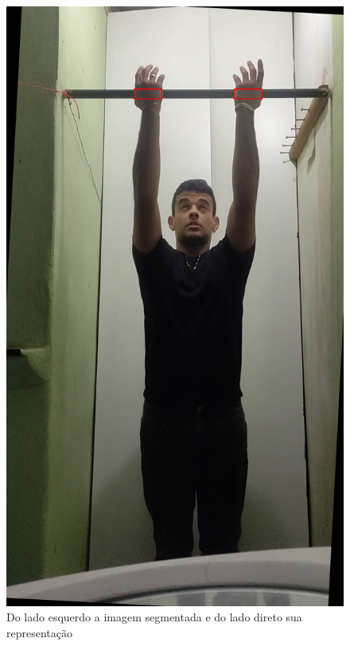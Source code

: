 \begin{figure}[!htbp]
\begin{minipage}{\sizeImg\textwidth}
        \end{minipage}
        \begin{minipage}{\sizeImg\textwidth}
            \includegraphics[width=\textwidth]{figuras/mao_barra/contornos.png}
        \end{minipage}
    \caption{Do lado esquerdo a imagem segmentada e do lado direto sua representação}
    \label{fig:binHand}
\end{figure}
\newpage



